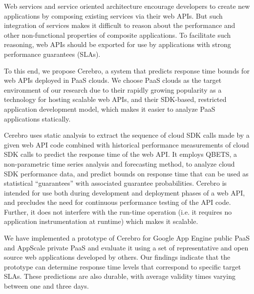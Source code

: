 Web services and service oriented architecture encourage developers to create new applications by
composing existing services via their web APIs. But such integration of services makes it difficult to
reason about the performance and other non-functional properties of 
composite applications. To
facilitate such reasoning, web APIs should be exported for use
by applications with strong performance 
guarantees (SLAs).%

To this end,
we propose Cerebro, a system that predicts response time 
bounds for web APIs deployed in PaaS clouds. We
choose PaaS clouds as the target environment of our 
research due to their rapidly growing popularity as a technology
for hosting scalable web APIs, and their SDK-based, restricted 
application development model, 
which makes it easier to analyze PaaS applications statically.

Cerebro uses static analysis to extract the sequence of cloud SDK 
calls made by a given web API code combined with
historical performance measurements of cloud SDK calls to predict 
the response time of the web
API. 
It employs QBETS, a non-parametric time series analysis and 
forecasting method, to analyze
cloud SDK performance data, and predict bounds
on response time that can be used as statistical ``guarantees'' with
associated guarantee probabilities.
Cerebro is intended for use both during development and 
deployment phases of a web API, and 
precludes the need for continuous performance testing of the API code. 
Further, it does not interfere with the run-time operation (i.e. it requires
no application instrumentation at runtime) which makes it scalable.

We have implemented a prototype of Cerebro for Google App Engine public PaaS
and AppScale private PaaS
and evaluate it using a set of representative
and open source web applications developed by others.  
Our findings indicate that the prototype can determine response time levels
that correspond to specific target SLAs.  These predictions are also durable,
with average validity times varying between one and three days.

